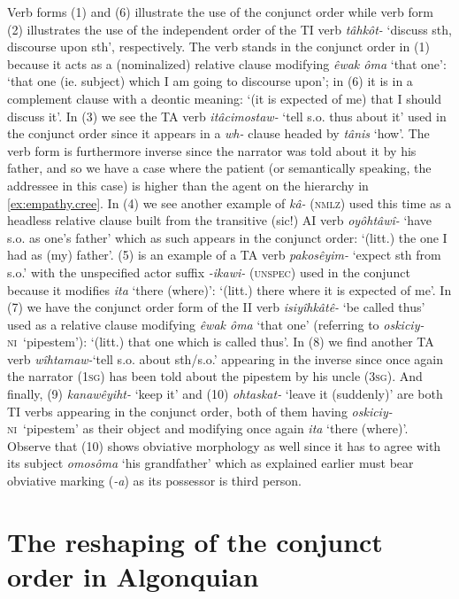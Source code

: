 \documentclass[twoside,a4paper,11pt]{article}
\newcommand{\ipa}[1]{{\phon\textit{#1}}}
\newcommand{\sg}{\textsc{sg}}
\newcommand{\ninan}{\textsc{ni}}
\newcommand{\nmlz}{\textsc{nmlz}}
\newcommand{\unspec}{\textsc{unspec}}
\begin{document}
Verb forms (1) and (6) illustrate the use of the conjunct order while verb form (2) illustrates the use of the independent order of the TI verb \textit{tâhkôt-} `discuss sth, discourse upon sth', respectively. The verb stands in the conjunct order in (1) because it acts as a (nominalized) relative clause modifying \ipa{êwak ôma} `that one': `that one (ie. subject) which I am going to discourse upon'; in (6) it is in a complement clause with a deontic meaning: `(it is expected of me) that I should discuss it'. In (3) we see the TA verb \ipa{itâcimostaw-} `tell s.o. thus about it' used in the conjunct order since it appears in a \textit{wh-} clause headed by \ipa{tânis} `how'. The verb form is furthermore inverse since the narrator was told about it by his father, and so we have a case where the patient (or semantically speaking, the addressee in this case) is higher than the agent on the hierarchy in \ref{ex:empathy.cree}. In (4) we see another example of \ipa{kâ-} (\nmlz) used this time as a headless relative clause built from the transitive (sic!) AI verb \ipa{oyôhtâwî-} `have s.o. as one's father' which as such appears in the conjunct order: `(litt.) the one I had as (my) father'. (5) is an example of a TA verb \ipa{pakosêyim-} `expect sth from s.o.' with the unspecified actor suffix \ipa{-ikawi-} (\unspec) used in the conjunct because it modifies \ipa{ita} `there (where)': `(litt.) there where it is expected of me'. In (7) we have the conjunct order form of the II verb \ipa{isiyîhkâtê-} `be called thus' used as a relative clause modifying \ipa{êwak ôma} `that one' (referring to  \ipa{oskiciy-} \ninan\ `pipestem'): `(litt.) that one which is called thus'. In (8) we find another TA verb \ipa{wîhtamaw-}`tell s.o. about sth/s.o.' appearing in the inverse since once again the narrator (1\sg) has been told about the pipestem by his uncle (3\sg). And finally, (9) \ipa{kanawêyiht-} `keep it' and (10) \ipa{ohtaskat-} `leave it (suddenly)' are both TI verbs appearing in the conjunct order, both of them having \ipa{oskiciy-} \ninan\ `pipestem' as their object and modifying once again \ipa{ita} `there (where)'. Observe that (10) shows obviative morphology as well since it has to agree with its subject \ipa{omosôma} `his grandfather' which as explained earlier must bear obviative marking (\ipa{-a}) as its possessor is third person.


\section{The reshaping of the conjunct order in Algonquian}
\end{document}
